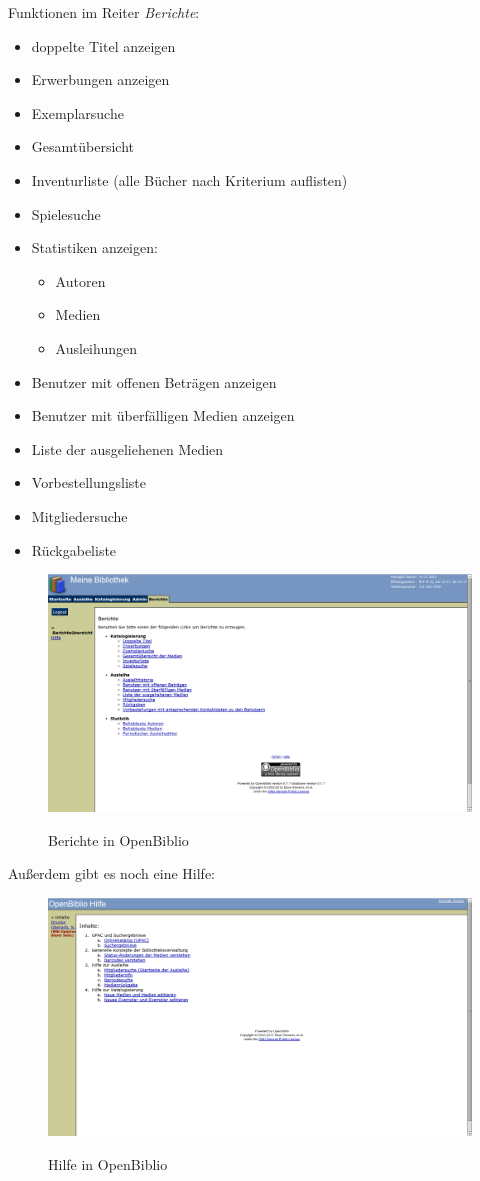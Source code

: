 \documentclass[fontsize=12pt,paper=a4,twoside]{scrartcl}
\begin{document}
\newpage
Funktionen im Reiter \emph{Berichte}:\\
\begin{itemize}
	\item doppelte Titel anzeigen
	\item Erwerbungen anzeigen
	\item Exemplarsuche
	\item Gesamtübersicht
	\item Inventurliste (alle Bücher nach Kriterium auflisten)
	\item Spielesuche
	\item Statistiken anzeigen:
	\begin{itemize}
		\item  Autoren
		\item Medien
		\item Ausleihungen
	\end{itemize}
	\item Benutzer mit offenen Beträgen anzeigen
	\item Benutzer mit überfälligen Medien anzeigen
	\item Liste der ausgeliehenen Medien
	\item Vorbestellungsliste
	\item Mitgliedersuche
	\item Rückgabeliste
\end{itemize}
\begin{figure}[h]
\caption{Berichte in OpenBiblio}
\includegraphics[width=1\textwidth]{OpenBiblio/reiter_berichte.png}
  \label{berichte-openbiblio}
\end{figure}
Außerdem gibt es noch eine Hilfe:
\begin{figure}[H]
\caption{Hilfe in OpenBiblio}
\includegraphics[width=14.2cm]{OpenBiblio/hilfe.png}
  \label{hilfe-openbiblio}
\end{figure}
\end{document}
